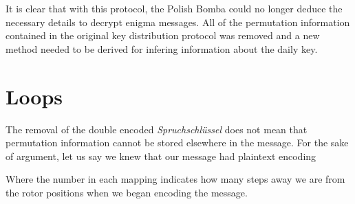 It is clear that with this protocol, the Polish Bomba could no longer deduce the necessary 
details to decrypt enigma messages. All of the permutation information contained in the original key distribution 
protocol was removed and a new method needed to be derived for infering information about the daily key.
\section{Loops}
The removal of the double encoded \emph{Spruchschlüssel} does not mean that permutation information cannot be stored elsewhere in the message. 
For the sake of argument, let us say we knew that our message had plaintext encoding

\begin{center}
\end{center}

Where the number in each mapping indicates how many steps away we are from the rotor 
positions when we began encoding the message.